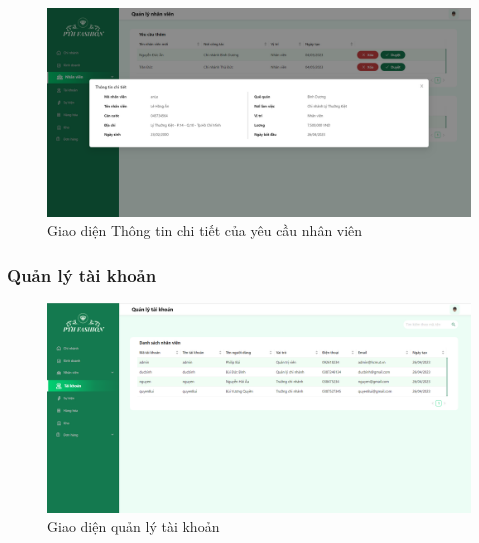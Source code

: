 \begin{figure}[!htp]
    \centering
    \includegraphics[width=12cm]{img/UI/admin_implement/staffRequestDetail.png}
    \newline
    \caption{Giao diện Thông tin chi tiết của yêu cầu nhân viên}
\end{figure}


\newpage

\subsubsection{Quản lý tài khoản}
\begin{figure}[!htp]
    \centering
    \includegraphics[width=12cm]{img/UI/admin_implement/account.png}
    \newline
    \caption{Giao diện quản lý tài khoản}
\end{figure}


